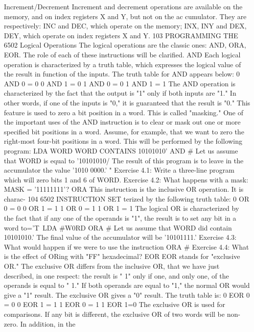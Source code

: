 Increment/Decrement
Increment and decrement operations are available on the
memory, and on index registers X and Y, but not on the ac
cumulator. They are respectively: INC and DEC, which operate on
the memory; INX, INY and DEX, DEY, which operate on index
registers X and Y.
103
PROGRAMMING THE 6502
Logical Operations
The logical operations are the classic ones: AND, ORA, EOR.
The role of each of these instructions will be clarified.
AND
Each logical operation is characterized by a truth table, which
expresses the logical value of the result in function of the inputs.
The truth table for AND appears below:
0 AND 0 = 0
0 AND 1 = 0
1 AND 0 = 0
1 AND 1 = 1
The AND operation is characterized by the fact that the output
is "1" only if both inputs are "1." In other words, if one of the
inputs is "0," it is guaranteed that the result is "0." This feature is
used to zero a bit position in a word. This is called "masking."
One of the important uses of the AND instruction is to clear or
mask out one or more specified bit positions in a word. Assume, for
example, that we want to zero the right-most four-bit positions in a
word. This will be performed by the following program:
LDA WORD WORD CONTAINS 10101010'
AND #%
Let us assume that WORD is equal to '10101010/ The result of
this program is to leave in the accumulator the value '1010 0000.'
"%
Exercise 4.1: Write a three-line program which will zero bits 1 and
6 of WORD.
Exercise 4.2: What happens with a mask: MASK = '11111111'?
ORA
This instruction is the inclusive OR operation. It is charac-
104
6502 INSTRUCTION SET
terized by the following truth table:
0 OR 0 = 0
0 OR 1 = 1
1 OR 0 = 1
1 OR 1 = 1
The logical OR is characterized by the fact that if any one of the
operands is "1", the result is to set any bit in a word to='T\
LDA #W0RD
ORA #%
Let us assume that WORD did contain 10101010.' The final
value of the accumulator will be '10101111.'
Exercise 4.3: What would happen if we were to use the instruction
ORA #%
Exercise 4.4: What is the effect of ORing with "FF" hexadecimal?
EOR
EOR stands for "exclusive OR." The exclusive OR differs from the
inclusive OR, that we have just described, in one respect: the result is " 1"
only if one, and only one, of the operands is equal to " 1." If both operands
are equal to "1," the normal OR would give a "1" result. The exclusive
OR gives a "0" result. The truth table is:
0 EOR 0 = 0
0 EOR 1 = 1
1 EOR 0 = 1
1 EOR 1=0
The exclusive OR is used for comparisons. If any bit is different,
the exclusive OR of two words will be non-zero. In addition, in the
